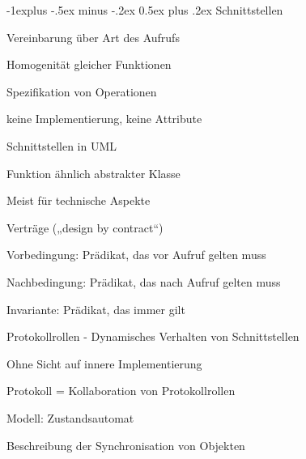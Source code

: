 \documentclass[a4paper]{article}
\makeatletter
\renewcommand{\subsection}{\@startsection{subsection}{2}{0mm}%
                                {-1explus -.5ex minus -.2ex}%
                                {0.5ex plus .2ex}%
                                {\normalfont\normalsize\bfseries}}
\makeatother
\begin{document}
\begin{multicols}{3}
  \subsection{Schnittstellen}
  \begin{itemize*}
    \item Vereinbarung über Art des Aufrufs
    \begin{itemize*}
      \item Homogenität gleicher Funktionen
      \item Spezifikation von Operationen
      \item keine Implementierung, keine Attribute
    \end{itemize*}
    \item Schnittstellen in UML
    \begin{itemize*}
      \item Funktion ähnlich abstrakter Klasse
      \item Meist für technische Aspekte
    \end{itemize*}
    \item Verträge („design by contract“)
    \begin{itemize*}
      \item Vorbedingung: Prädikat, das vor Aufruf gelten muss
      \item Nachbedingung: Prädikat, das nach Aufruf gelten muss
      \item Invariante: Prädikat, das immer gilt
    \end{itemize*}
  \end{itemize*}

  Protokollrollen - Dynamisches Verhalten von Schnittstellen
  \begin{itemize*}
    \item Ohne Sicht auf innere Implementierung
    \item Protokoll = Kollaboration von Protokollrollen
    \item Modell: Zustandsautomat
      \item Beschreibung der Synchronisation von Objekten
  \end{itemize*}


\end{multicols}
\end{document}
